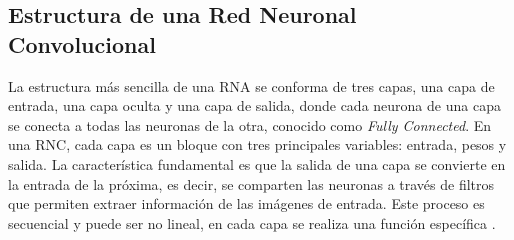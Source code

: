 \subsection {Estructura de una Red Neuronal Convolucional}

La estructura más sencilla de una RNA se conforma de tres capas, una capa de entrada, una capa oculta y una capa de salida, donde cada neurona de una capa se conecta a todas las neuronas de la otra, conocido como \textit{Fully Connected}. En una RNC, cada capa es un bloque con tres principales variables: entrada, pesos y salida. La característica fundamental es que la salida de una capa se convierte en la entrada de la próxima, es decir, se comparten las neuronas a través de filtros que permiten extraer información de las imágenes de entrada. Este proceso es secuencial y puede ser no lineal, en cada capa se realiza una función específica \cite{lecun1998gradient}.

